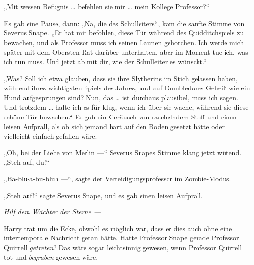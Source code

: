 „Mit wessen Befugnis … befehlen sie mir … mein Kollege Professor?“

Es gab eine Pause, dann:
„Na, die des Schulleiters“, kam die sanfte Stimme von Severus Snape.
„Er hat mir befohlen, diese Tür während des Quidditchspiels zu bewachen, und als Professor muss ich seinen Launen gehorchen. Ich werde mich später mit dem Obersten Rat darüber unterhalten, aber im Moment tue ich, was ich tun muss. Und jetzt ab mit dir, wie der Schulleiter es wünscht.“

„Was? Soll ich etwa glauben, dass sie ihre Slytherins im Stich gelassen haben, während ihres wichtigsten Spiels des Jahres, und auf Dumbledores Geheiß wie ein Hund aufgesprungen sind? Nun, das … ist durchaus plausibel, muss ich sagen. Und trotzdem … halte ich es für klug, wenn ich über sie wache, während sie diese schöne Tür bewachen.“
Es gab ein Geräusch von raschelndem Stoff und einen leisen Aufprall, als ob sich jemand hart auf den Boden gesetzt hätte oder vielleicht einfach gefallen wäre.

„Oh, bei der Liebe von Merlin —“ Severus Snapes Stimme klang jetzt wütend.
„Steh auf, du!“

„Ba-blu-a-bu-bluh —“, sagte der Verteidigungsprofessor im Zombie-Modus.

„Steh auf!“ sagte Severus Snape, und es gab einen leisen Aufprall.

\emph{Hilf dem Wächter der Sterne —}

Harry trat um die Ecke, obwohl es möglich war, dass er dies auch ohne eine intertemporale Nachricht getan hätte. Hatte Professor Snape gerade Professor Quirrell \emph{getreten}? Das wäre sogar leichtsinnig gewesen, wenn Professor Quirrell tot und \emph{begraben} gewesen wäre.

